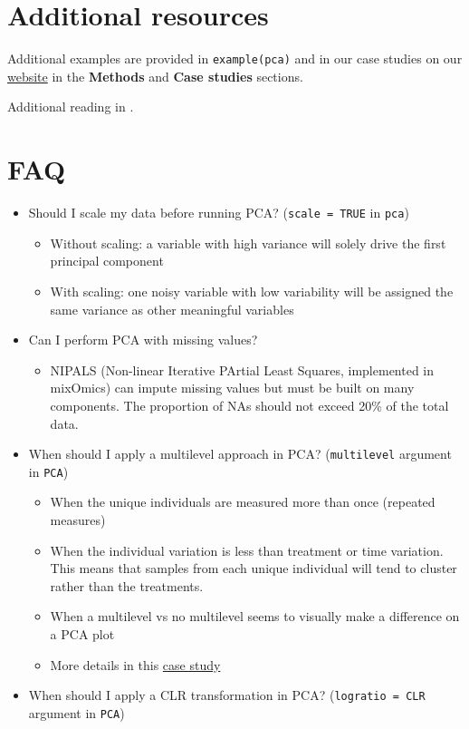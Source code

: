 \documentclass[]{book}
\providecommand{\tightlist}{%
  \setlength{\itemsep}{0pt}\setlength{\parskip}{0pt}}
\begin{document}
\hypertarget{additional-resources}{%
\section{Additional resources}\label{additional-resources}}

Additional examples are provided in \texttt{example(pca)} and in our case studies on our \href{http://www.mixomics.org}{website} in the \textbf{Methods} and \textbf{Case studies} sections.

Additional reading in \citep{She08}.

\hypertarget{faq}{%
\section{FAQ}\label{faq}}

\begin{itemize}
\tightlist
\item
  Should I scale my data before running PCA? (\texttt{scale\ =\ TRUE} in \texttt{pca})

  \begin{itemize}
  \tightlist
  \item
    Without scaling: a variable with high variance will solely drive the first principal component
  \item
    With scaling: one noisy variable with low variability will be assigned the same variance as other meaningful variables
  \end{itemize}
\item
  Can I perform PCA with missing values?

  \begin{itemize}
  \tightlist
  \item
    NIPALS (Non-linear Iterative PArtial Least Squares, implemented in mixOmics) can impute missing values but must be built on many components. The proportion of NAs should not exceed 20\% of the total data.
  \end{itemize}
\item
  When should I apply a multilevel approach in PCA? (\texttt{multilevel} argument in \texttt{PCA})

  \begin{itemize}
  \tightlist
  \item
    When the unique individuals are measured more than once (repeated measures)
  \item
    When the individual variation is less than treatment or time variation. This means that samples from each unique individual will tend to cluster rather than the treatments.
  \item
    When a multilevel vs no multilevel seems to visually make a difference on a PCA plot
  \item
    More details in this \href{http://mixomics.org/case-studies/multilevel-vac18/}{case study}
  \end{itemize}
\item
  When should I apply a CLR transformation in PCA? (\texttt{logratio\ =\ \textquotesingle{}CLR\textquotesingle{}} argument in \texttt{PCA})


\end{itemize}
\end{document}
